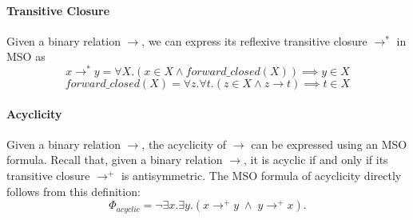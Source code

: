 
\paragraph*{Transitive Closure}
Given a binary relation $\to$, we can express its reflexive transitive closure $\to^*$ in MSO as
\[
x \to^* y = \forall X.(x \in X \wedge forward\_closed(X)) \implies y \in X
\]
\[
forward\_closed(X) = \forall z.\forall t.(z \in X \wedge z \to t) \implies t \in X
\]

\paragraph*{Acyclicity} 

Given a binary relation $\to$, the acyclicity of $\to$ can be expressed using an MSO formula. Recall that, given a binary relation $\to$, it is acyclic if and only if its transitive closure $\to^+$ is antisymmetric. The MSO formula of acyclicity directly follows from this definition:
\[
\Phi_{acyclic} =  \neg \exists x.\exists y.(x \to^+ y \;\wedge\; y \to^+ x).   
\]